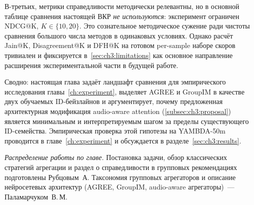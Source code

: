 В-третьих, метрики справедливости методически релевантны, но в основной таблице сравнения настоящей ВКР \emph{не используются}: эксперимент ограничен NDCG@K, $K \in \{10, 20\}$. Это сознательное методическое сужение ради чистоты сравнения большого числа методов в одинаковых условиях. Однако расчёт Jain@K, Disagreement@K и DFH@K на готовом per-sample наборе скоров тривиален и фиксируется в~\ref{sec:ch3:limitations} как основное направление расширения экспериментальной части в будущей работе.

Сводно: настоящая глава задаёт ландшафт сравнения для эмпирического исследования главы~\ref{ch:experiment}, выделяет AGREE и GroupIM в качестве двух обучаемых ID-бейзлайнов и аргументирует, почему предложенная архитектурная модификация audio-aware attention (\ref{subsec:ch3:proposal}) является минимальным и интерпретируемым шагом за пределы существующего ID-семейства. Эмпирическая проверка этой гипотезы на YAMBDA-50m проводится в главе~\ref{ch:experiment} и обсуждается в разделе~\ref{sec:ch3:results}.

\textit{Распределение работы по главе.} Постановка задачи, обзор классических стратегий агрегации и раздел о справедливости в групповых рекомендациях подготовлены Рубцовым~А. Таксономия групповых агрегаторов и описание нейросетевых архитектур (AGREE, GroupIM, audio-aware агрегаторы)~--- Паламарчуком~В.\,М.
